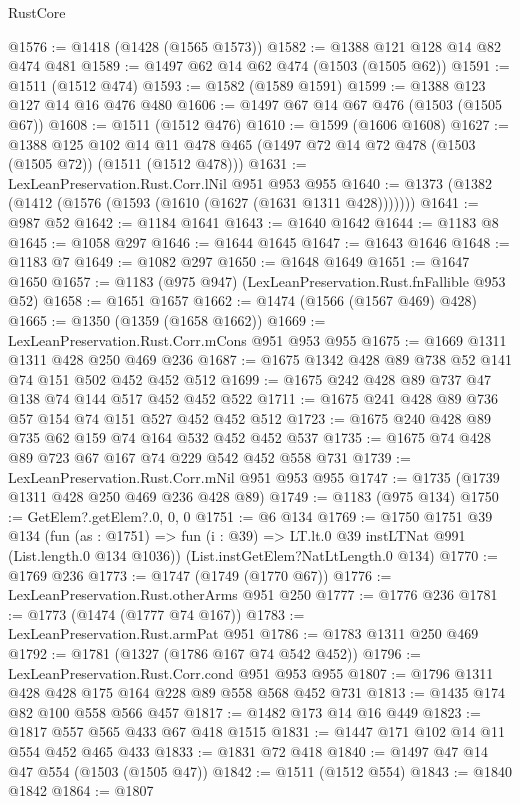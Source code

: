 \begin{lexlean}{RustCore}
\begin{coremodule}
@1576 := @1418 (@1428 (@1565 @1573))
@1582 := @1388 @121 @128 @14 @82 @474 @481
@1589 := @1497 @62 @14 @62 @474 (@1503 (@1505 @62))
@1591 := @1511 (@1512 @474)
@1593 := @1582 (@1589 @1591)
@1599 := @1388 @123 @127 @14 @16 @476 @480
@1606 := @1497 @67 @14 @67 @476 (@1503 (@1505 @67))
@1608 := @1511 (@1512 @476)
@1610 := @1599 (@1606 @1608)
@1627 := @1388
    @125
    @102
    @14
    @11
    @478
    @465
    (@1497 @72 @14 @72 @478 (@1503 (@1505 @72)) (@1511 (@1512 @478)))
@1631 := LexLeanPreservation.Rust.Corr.lNil @951 @953 @955
@1640 := @1373 (@1382 (@1412 (@1576 (@1593 (@1610 (@1627 (@1631 @1311 @428)))))))
@1641 := @987 @52
@1642 := @1184 @1641
@1643 := @1640 @1642
@1644 := @1183 @8
@1645 := @1058 @297
@1646 := @1644 @1645
@1647 := @1643 @1646
@1648 := @1183 @7
@1649 := @1082 @297
@1650 := @1648 @1649
@1651 := @1647 @1650
@1657 := @1183 (@975 @947) (LexLeanPreservation.Rust.fnFallible @953 @52)
@1658 := @1651 @1657
@1662 := @1474 (@1566 (@1567 @469) @428)
@1665 := @1350 (@1359 (@1658 @1662))
@1669 := LexLeanPreservation.Rust.Corr.mCons @951 @953 @955
@1675 := @1669 @1311 @1311 @428 @250 @469 @236
@1687 := @1675 @1342 @428 @89 @738 @52 @141 @74 @151 @502 @452 @452 @512
@1699 := @1675 @242 @428 @89 @737 @47 @138 @74 @144 @517 @452 @452 @522
@1711 := @1675 @241 @428 @89 @736 @57 @154 @74 @151 @527 @452 @452 @512
@1723 := @1675 @240 @428 @89 @735 @62 @159 @74 @164 @532 @452 @452 @537
@1735 := @1675 @74 @428 @89 @723 @67 @167 @74 @229 @542 @452 @558 @731
@1739 := LexLeanPreservation.Rust.Corr.mNil @951 @953 @955
@1747 := @1735 (@1739 @1311 @428 @250 @469 @236 @428 @89)
@1749 := @1183 (@975 @134)
@1750 := GetElem?.getElem?.{0, 0, 0}
@1751 := @6 @134
@1769 := @1750
    @1751
    @39
    @134
    (fun (as : @1751) => fun (i : @39) => LT.lt.{0} @39 instLTNat @991 (List.length.{0} @134 @1036))
    (List.instGetElem?NatLtLength.{0} @134)
@1770 := @1769 @236
@1773 := @1747 (@1749 (@1770 @67))
@1776 := LexLeanPreservation.Rust.otherArms @951 @250
@1777 := @1776 @236
@1781 := @1773 (@1474 (@1777 @74 @167))
@1783 := LexLeanPreservation.Rust.armPat @951
@1786 := @1783 @1311 @250 @469
@1792 := @1781 (@1327 (@1786 @167 @74 @542 @452))
@1796 := LexLeanPreservation.Rust.Corr.cond @951 @953 @955
@1807 := @1796 @1311 @428 @428 @175 @164 @228 @89 @558 @568 @452 @731
@1813 := @1435 @174 @82 @100 @558 @566 @457
@1817 := @1482 @173 @14 @16 @449
@1823 := @1817 @557 @565 @433 @67 @418 @1515
@1831 := @1447 @171 @102 @14 @11 @554 @452 @465 @433
@1833 := @1831 @72 @418
@1840 := @1497 @47 @14 @47 @554 (@1503 (@1505 @47))
@1842 := @1511 (@1512 @554)
@1843 := @1840 @1842
@1864 := @1807

\end{coremodule}
\end{lexlean}
